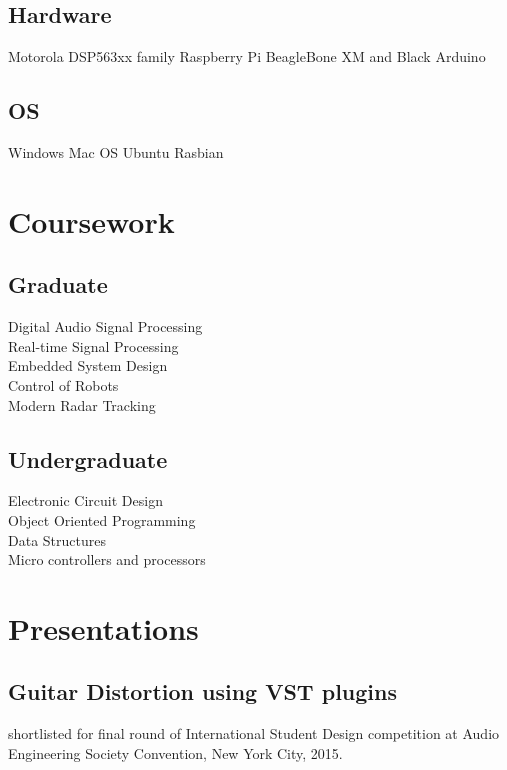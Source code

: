 \documentclass[]{deedy-resume-openfont}
\begin{document}
\begin{minipage}[t]{0.25\textwidth}
\subsection{Hardware}
Motorola DSP563xx family \textbullet{} Raspberry Pi \textbullet{} BeagleBone XM and Black \textbullet{} Arduino 
\sectionsep
\subsection{OS}
Windows \textbullet{} Mac OS \textbullet{} Ubuntu \textbullet{} Rasbian 
\sectionsep


\section{Coursework}
\subsection{Graduate}
\sectionsep
Digital Audio Signal Processing\\
Real-time Signal Processing\\
Embedded System Design\\
Control of Robots\\
Modern Radar Tracking\\
\sectionsep
\subsection{Undergraduate}
\sectionsep
Electronic Circuit Design\\
Object Oriented Programming\\
Data Structures\\
Micro controllers and processors

\section{Presentations}

\subsection{Guitar Distortion using VST plugins} 
\sectionsep
shortlisted for final round of International Student Design competition at Audio Engineering Society Convention, New York City, 2015.
%
%

\end{minipage} 
\end{document}
